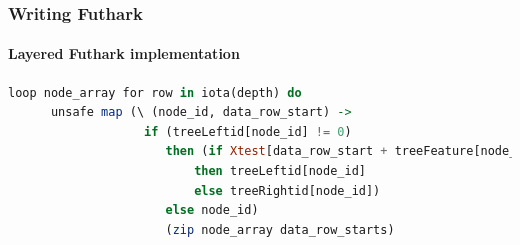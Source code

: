 \documentclass[12pt,t]{beamer}
\begin{document}
\begin{frame}[fragile]
  \frametitle{Writing Futhark}
  \framesubtitle{Layered Futhark implementation}
  \begin{minipage}{\textwidth}
  \begin{lstlisting}[language=Haskell, breaklines]
  loop node_array for row in iota(depth) do
      unsafe map (\ (node_id, data_row_start) ->
                   if (treeLeftid[node_id] != 0)
                      then (if Xtest[data_row_start + treeFeature[node_id]] <= treeThres_or_leaf[node_id]
                          then treeLeftid[node_id]
                          else treeRightid[node_id])
                      else node_id)
                      (zip node_array data_row_starts)
  \end{lstlisting}
  \end{minipage}
%
%
%

\end{frame}
\end{document}
